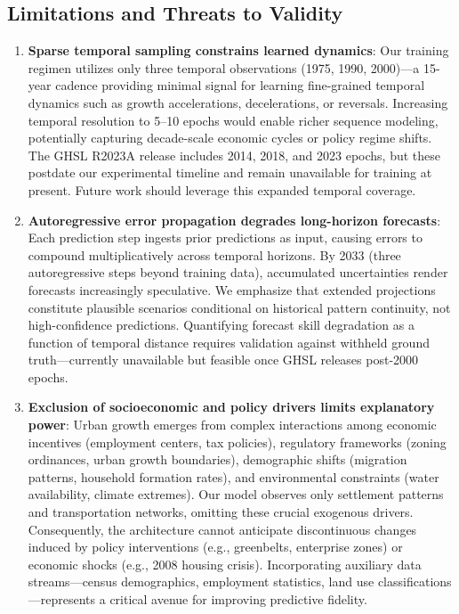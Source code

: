 \documentclass[conference]{IEEEtran}
\begin{document}
\subsection{Limitations and Threats to Validity}
\begin{enumerate}
    \item \textbf{Sparse temporal sampling constrains learned dynamics}: Our training regimen utilizes only three temporal observations (1975, 1990, 2000)---a 15-year cadence providing minimal signal for learning fine-grained temporal dynamics such as growth accelerations, decelerations, or reversals. Increasing temporal resolution to 5--10 epochs would enable richer sequence modeling, potentially capturing decade-scale economic cycles or policy regime shifts. The GHSL R2023A release includes 2014, 2018, and 2023 epochs, but these postdate our experimental timeline and remain unavailable for training at present. Future work should leverage this expanded temporal coverage.
    
    \item \textbf{Autoregressive error propagation degrades long-horizon forecasts}: Each prediction step ingests prior predictions as input, causing errors to compound multiplicatively across temporal horizons. By 2033 (three autoregressive steps beyond training data), accumulated uncertainties render forecasts increasingly speculative. We emphasize that extended projections constitute plausible scenarios conditional on historical pattern continuity, not high-confidence predictions. Quantifying forecast skill degradation as a function of temporal distance requires validation against withheld ground truth---currently unavailable but feasible once GHSL releases post-2000 epochs.
    
    \item \textbf{Exclusion of socioeconomic and policy drivers limits explanatory power}: Urban growth emerges from complex interactions among economic incentives (employment centers, tax policies), regulatory frameworks (zoning ordinances, urban growth boundaries), demographic shifts (migration patterns, household formation rates), and environmental constraints (water availability, climate extremes). Our model observes only settlement patterns and transportation networks, omitting these crucial exogenous drivers. Consequently, the architecture cannot anticipate discontinuous changes induced by policy interventions (e.g., greenbelts, enterprise zones) or economic shocks (e.g., 2008 housing crisis). Incorporating auxiliary data streams---census demographics, employment statistics, land use classifications---represents a critical avenue for improving predictive fidelity.
    

\end{enumerate}
\end{document}

